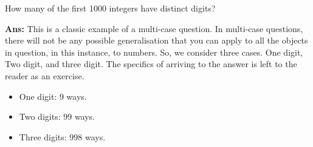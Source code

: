 \begin{example}
    How many of the first 1000 integers have distinct digits?

    \textbf{Ans:} This is a classic example of a multi-case question. In multi-case questions, there will not be any possible generalisation that you can apply to all the objects in question, in this instance, to numbers. So, we consider three cases. One digit, Two digit, and three digit. The specifics of arriving to the answer is left to the reader as an exercise.
    \begin{itemize}
        \item One digit: \mbox{$\boxed{9}$} ways.
        \item Two digits: \mbox{$\boxed{9}\boxed{9}$} ways. 
        \item Three digits: \mbox{$\boxed{9}\boxed{9}\boxed{8}$} ways.
    \end{itemize}
\end{example}


